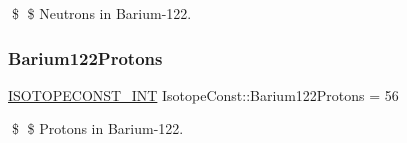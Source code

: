 \$ \$ Neutrons in Barium-\/122. \mbox{\label{group___isotope_const-_barium-_ba122_ga79d41d9496dea42aafe65ecf744588bc}} 
\subsubsection{\texorpdfstring{Barium122\+Protons}{Barium122Protons}}
{\footnotesize\ttfamily \mbox{\hyperlink{group___isotope_const-_macros_ga5f18360b3e99483a35c32d789e62621c}{I\+S\+O\+T\+O\+P\+E\+C\+O\+N\+S\+T\+\_\+\+I\+NT}} Isotope\+Const\+::\+Barium122\+Protons = 56}

\$ \$ Protons in Barium-\/122. 